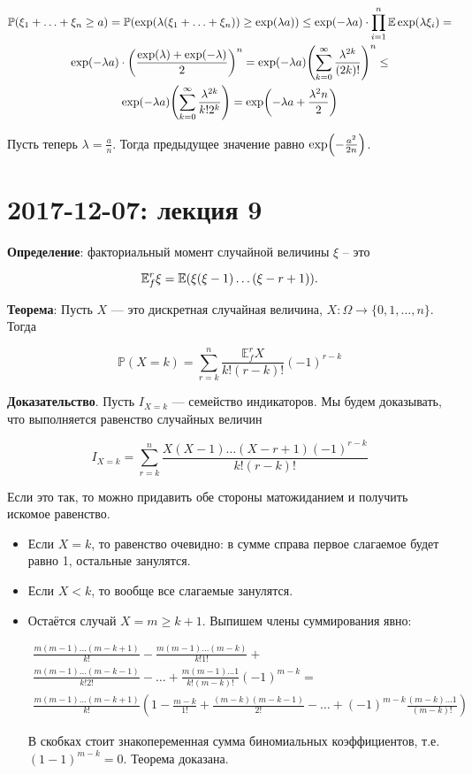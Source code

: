 \documentclass[12pt]{article}
\DeclarePairedDelimiter\autobracket{(}{)}
\newcommand{\br}[1]{\autobracket*{#1}}
\renewcommand{\P}{\mathbb{P}}
\newcommand{\E}{\mathbb{E}}
\begin{document}
\begin{multline*}
\P(\xi_1 + \ldots + \xi_n \geq a) =
\P(\exp(\lambda(\xi_1 + \ldots + \xi_n)) \geq \exp(\lambda a)) \leq
\exp(- \lambda a) \cdot \prod_{i = 1}^n \E \exp(\lambda \xi_i) = \\
\exp(- \lambda a) \cdot \br{\frac {\exp(\lambda) + \exp(- \lambda)} 2}^n =
\exp(- \lambda a) \br{\sum_{k = 0}^\infty \frac {\lambda^{2k}} {(2k)!}}^n \leq \\
\exp(- \lambda a) \br{\sum_{k = 0}^\infty \frac {\lambda^{2k}} {k! 2^k}} =
\exp \br{- \lambda a + \frac {\lambda^2 n} 2}
\end{multline*}

Пусть теперь $\lambda = \frac a n$. Тогда предыдущее значение равно $\exp \br{- \frac {a^2} {2n}}$.

\section{2017-12-07: лекция 9}

\textbf{Определение}: факториальный момент случайной величины $\xi$ – это

\[
\E_f^r \xi = \E \br{\xi (\xi - 1) \ldots (\xi - r + 1)}.
\]

\textbf{Теорема}: Пусть $X$ — это дискретная случайная величина, $X \colon \Omega \to \{ 0, 1, \ldots, n \}$. Тогда

\[
\P (X = k) = \sum_{r = k}^n \frac {\E^r_f X} {k! (r - k)!} (-1)^{r - k}
\]

\textbf{Доказательство}. Пусть $I_{X=k}$ — семейство индикаторов. Мы будем доказывать, что выполняется равенство случайных величин

\[
I_{X=k} = \sum_{r = k}^n \frac {X (X - 1) \ldots (X - r + 1) (-1)^{r-k}} {k! (r - k)!}
\]

Если это так, то можно придавить обе стороны матожиданием и получить искомое равенство.

\begin{itemize}
\item Если $X = k$, то равенство очевидно: в сумме справа первое слагаемое будет равно 1, остальные занулятся.
\item Если $X < k$, то вообще все слагаемые занулятся.
\item Остаётся случай $X = m \geq k + 1$. Выпишем члены суммирования явно:

\begin{multline*}
\frac {m(m - 1) \ldots (m - k + 1)} {k!} -
\frac {m(m - 1) \ldots (m - k)} {k! 1!} + \\
\frac {m(m - 1) \ldots (m - k - 1)} {k! 2!} - \ldots
+ \frac {m(m - 1) \ldots 1} {k! (m - k)!} (-1)^{m - k} = \\
\frac {m(m - 1) \ldots (m - k + 1)} {k!} \left(
1 -
\frac {m - k} {1!} +
\frac {(m - k) (m - k - 1)} {2!} - \ldots
+ (-1)^{m - k} \frac {(m - k) \ldots 1} {(m - k)!}
\right)
\end{multline*}

В скобках стоит знакопеременная сумма биномиальных коэффициентов, т.е. $(1 - 1)^{m - k} = 0$. Теорема доказана.
\end{itemize}
\end{document}
